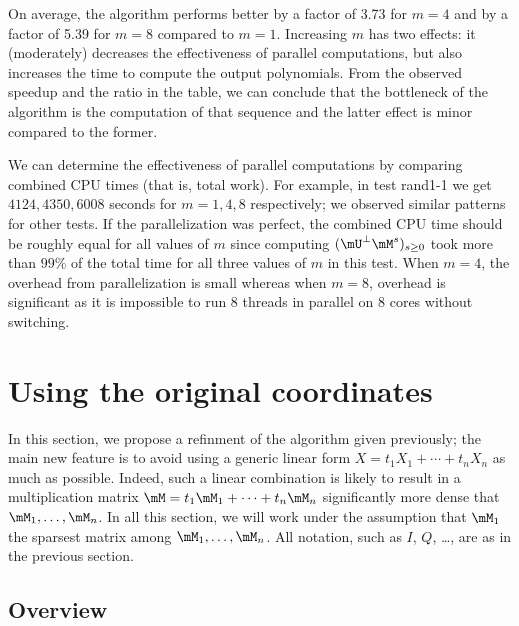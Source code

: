 \documentclass[12pt]{article}
\newcommand{\lf}{X}
\begin{document}
On average, the algorithm performs better by a factor of 3.73 for
$m=4$ and by a factor of 5.39 for $m=8$ compared to $m=1$. Increasing
$m$ has two effects: it (moderately) decreases the effectiveness of
parallel computations, but also increases the time to compute the
output polynomials. From the observed speedup and the ratio in the
table, we can conclude that the bottleneck of the algorithm is
the computation of that sequence and the latter effect is minor
compared to the former.

We can determine the effectiveness of parallel computations by
comparing combined CPU times (that is, total work).  For example, in
test rand1-1 we get $4124, 4350, 6008$ seconds for $m=1,4,8$
respectively; we observed similar patterns for other tests. If the
parallelization was perfect, the combined CPU time should be roughly
equal for all values of $m$ since computing $(\mU^{\perp}
\mM^s)_{s\ge0}$ took more than $99\%$ of the total time for all three
values of $m$ in this test. When $m=4$, the overhead from
parallelization is small whereas when $m=8$, overhead is significant
as it is impossible to run 8 threads in parallel on 8 cores without
switching.


\section{Using the original coordinates}

In this section, we propose a refinment of the algorithm given
previously; the main new feature is to avoid using a generic linear
form $\lf = t_1 X_1 + \cdots + t_n X_n$ as much as possible.  Indeed,
such a linear combination is likely to result in a multiplication
matrix $\mM = t_1 \mM_1 + \cdots + t_n \mM_n$ significantly more dense
that $\mM_1,\dots,\mM_n$. In all this section, we will work under the
assumption that $\mM_1$ the sparsest matrix among $\mM_1,\dots,\mM_n$.
All notation, such as $I$, $Q$, \dots, are as in the previous section.


\subsection{Overview}
\end{document}
